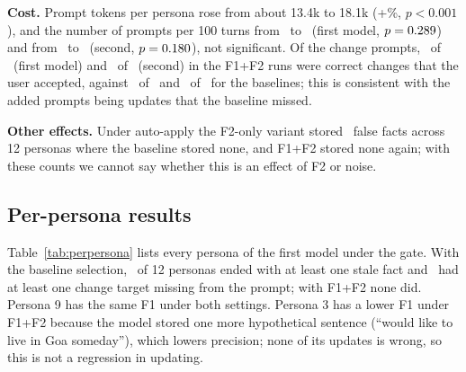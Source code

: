 \IfFileExists{IEEEtran.cls}{\documentclass[journal]{IEEEtran}\def\HAVEIEEE{1}}{\documentclass[10pt,twocolumn]{article}\usepackage[margin=0.7in,columnsep=0.25in]{geometry}}
\begin{document}
\textbf{Cost.} Prompt tokens per persona rose from about 13.4k to 18.1k (+\tokInc\%, $p<0.001$), and the number of prompts per 100 turns from \realAgatepromptsPerOneZeroZeroTurnsBase\ to \realAgatepromptsPerOneZeroZeroTurnsBoth\ (first model, $p=0.289$) and from \realBgatepromptsPerOneZeroZeroTurnsBase\ to \realBgatepromptsPerOneZeroZeroTurnsBoth\ (second, $p=0.180$), not significant. Of the change prompts, \gateAcceptedABoth\ of \gatePromptsABoth\ (first model) and \gateAcceptedBBoth\ of \gatePromptsBBoth\ (second) in the F1+F2 runs were correct changes that the user accepted, against \gateAcceptedABase\ of \gatePromptsABase\ and \gateAcceptedBBase\ of \gatePromptsBBase\ for the baselines; this is consistent with the added prompts being updates that the baseline missed.\label{sec:cost}

\textbf{Other effects.} Under auto-apply the F2-only variant stored \falseAutoTwoA\ false facts across 12 personas where the baseline stored none, and F1+F2 stored none again; with these counts we cannot say whether this is an effect of F2 or noise.

\subsection{Per-persona results}
Table~\ref{tab:perpersona} lists every persona of the first model under the gate. With the baseline selection, \personasStaleBase\ of 12 personas ended with at least one stale fact and \personasMissBase\ had at least one change target missing from the prompt; with F1+F2 none did. Persona 9 has the same F1 under both settings. Persona 3 has a lower F1 under F1+F2 because the model stored one more hypothetical sentence (``would like to live in Goa someday''), which lowers precision; none of its updates is wrong, so this is not a regression in updating.

\begin{table}[!t]
\centering\footnotesize
\caption{Per-persona results, first model, gate policy. Missed targets: change turns whose target memory was not in the prompt.}
\label{tab:perpersona}
\end{table}
\end{document}
